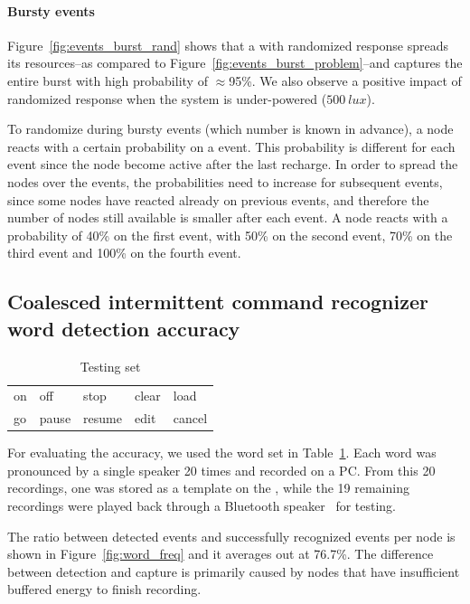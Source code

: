 \paragraph{Bursty events}
Figure~\ref{fig:events_burst_rand} shows that a \sys with randomized response spreads its resources--as compared to Figure~\ref{fig:events_burst_problem}--and captures the entire burst with high probability of $\approx$95\%. We also observe a positive impact of randomized response when the system is under-powered ($\SI{500}{lux}$).

To randomize during bursty events (which number is known in advance), a node reacts with a certain probability on a event. This probability is different for each event since the node become active after the last recharge. In order to spread the nodes over the events, the probabilities need to increase for subsequent events, since some nodes have reacted already on previous events, and therefore the number of nodes still available is smaller after each event.
A node reacts with a probability of 40\% on the first event, with 50\% on the second event, 70\% on the third event and 100\% on the fourth event.


\subsection{Coalesced intermittent command recognizer word detection accuracy}
\begin{table}[H]
\centering
\caption{Testing set}
\label{tab:words}
\begin{tabular}{lllll}
\hline
on    & off  & stop & clear & load   \\
go & pause & resume & edit  & cancel  \\  
\hline  
\end{tabular}
\end{table}

For evaluating the \fullcim accuracy, we used the word set in Table~\ref{tab:words}.
Each word was pronounced by a single speaker 20 times and recorded on a PC. From this 20 recordings, one was stored as a template on the \cim, while the 19 remaining recordings were played back through a Bluetooth speaker~\cite{microphone} for testing.

The ratio between detected events and successfully recognized events per node is shown in Figure~\ref{fig:word_freq} and it averages out at  76.7\%. The difference between detection and capture is primarily caused by nodes that have insufficient buffered energy to finish recording.  

